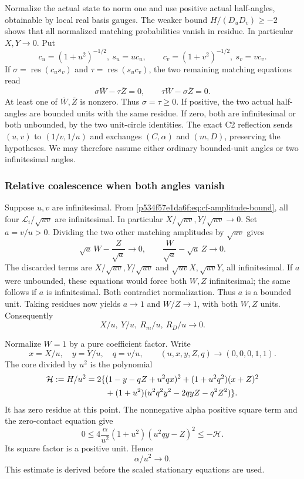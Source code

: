 Normalize the actual state to norm one and use positive actual
half-angles, obtainable by local real basis gauges. The weaker
bound \(H/(D_uD_v)\ge-2\) shows that all normalized matching
probabilities vanish in residue. In particular \(X,Y\to0\).
Put
\[
c_u=(1+u^2)^{-1/2},\ s_u=uc_u,\qquad
c_v=(1+v^2)^{-1/2},\ s_v=vc_v.
\]
If \(\sigma=\operatorname{res}(c_us_v)\) and
\(\tau=\operatorname{res}(s_uc_v)\), the two remaining matching
equations read
\[
\sigma\overline W-\tau\overline Z=0,\qquad
\tau\overline W-\sigma\overline Z=0.
\]
At least one of \(\overline W,\overline Z\) is nonzero. Thus
\(\sigma=\tau\ge0\). If positive, the two actual half-angles are
bounded units with the same residue. If zero, both are infinitesimal
or both unbounded, by the two unit-circle identities. The exact C2
reflection sends \((u,v)\) to \((1/v,1/u)\) and exchanges
\((C,\alpha)\) and \((m,D)\), preserving the hypotheses. We may
therefore assume either ordinary bounded-unit angles or two
infinitesimal angles.

\subsubsection*{Relative coalescence when both angles vanish}
Suppose \(u,v\) are infinitesimal. From
\eqref{p534f57e1da6f:eq:cf-amplitude-bound}, all four
\(\mathcal L_i/\sqrt{uv}\) are infinitesimal. In particular
\(X/\sqrt{uv},Y/\sqrt{uv}\to0\). Set \(a=v/u>0\).
Dividing the two other matching amplitudes by \(\sqrt{uv}\) gives
\[
\sqrt a\,W-\frac Z{\sqrt a}\longrightarrow0,\qquad
\frac W{\sqrt a}-\sqrt a\,Z\longrightarrow0.
\]
The discarded terms are \(X/\sqrt{uv},Y/\sqrt{uv}\) and
\(\sqrt{uv}X,\sqrt{uv}Y\), all infinitesimal.
If \(a\) were unbounded, these equations would force both \(W,Z\)
infinitesimal; the same follows if \(a\) is infinitesimal.
Both contradict normalization. Thus \(a\) is a bounded unit.
Taking residues now yields \(a\to1\) and \(W/Z\to1\), with
both \(W,Z\) units. Consequently
\[
                  X/u,\ Y/u,\ R_m/u,\ R_D/u\longrightarrow0.
\]

Normalize \(W=1\) by a pure coefficient factor. Write
\[
x=X/u,\quad y=Y/u,\quad q=v/u,\qquad
(u,x,y,Z,q)\longrightarrow(0,0,0,1,1).
\]
The core divided by \(u^2\) is the polynomial
\begin{align}
\mathcal H:=H/u^2=2\{&
(1-y-qZ+u^2qx)^2+(1+u^2q^2)(x+Z)^2 \notag\\
&+(1+u^2)(u^2q^2y^2-2qyZ-q^2Z^2)\}. \label{p534f57e1da6f:eq:cf-scaled-core}
\end{align}
It has zero residue at this point. The nonnegative alpha positive square term and
the zero-contact equation give
\[
0\le4\frac{\alpha}{u^2}(1+u^2)(u^2qy-Z)^2
                   \le-\mathcal H.
\]
Its square factor is a positive unit. Hence
\begin{equation}
                         \alpha/u^2\longrightarrow0. \label{p534f57e1da6f:eq:cf-alpha-scale}
\end{equation}
This estimate is derived before the scaled stationary equations are used.

